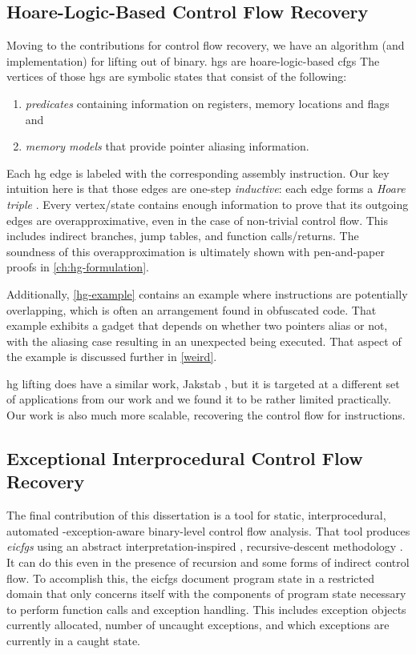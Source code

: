 \subsection{Hoare-Logic-Based Control Flow Recovery}
Moving to the contributions for control flow recovery, we have an algorithm (and implementation) for lifting  out of  binary.
\Acp{hg} are \gls{hoare-logic}-based \acp{cfg}
The vertices of those \acp{hg} are symbolic states that consist of the following:
\begin{enumerate}
  \item \emph{predicates} containing information on registers, memory locations and flags and
  \item \emph{memory models} that provide pointer aliasing information.
\end{enumerate}
Each \ac{hg} edge is labeled with the corresponding assembly instruction.
Our key intuition here is that those edges are one-step \emph{inductive}:
each edge forms a \emph{Hoare triple}
\autocite{hoare1969axiomatic}.
Every vertex/state contains enough information to prove that its outgoing edges are overapproximative,
even in the case of non-trivial control flow.
This includes indirect branches, jump tables, and function calls/returns.
The soundness of this overapproximation is ultimately shown with pen-and-paper proofs in \cref{ch:hg-formulation}.

Additionally, \cref{hg-example} contains an example where instructions are potentially overlapping, which is often an arrangement found in obfuscated code.
That example exhibits a  gadget that depends on whether two pointers alias or not, with the aliasing case resulting in an unexpected  being executed. That aspect of the example is discussed further in \cref{weird}.

\Ac{hg} lifting does have a similar work, Jakstab \autocite{kinder2010static,kinder2012alternating,kinder2012virtualization}, but it is targeted at a different set of applications from our work and we found it to be rather limited practically.
Our work is also much more scalable, recovering the control flow for  instructions.

\subsection{Exceptional Interprocedural Control Flow Recovery}
The final contribution of this dissertation is a tool for static, interprocedural, automated \Cpp-exception-aware%
 
binary-level control flow analysis.
That tool produces \emph{\acp{eicfg}} using an abstract interpretation-inspired , recursive-descent methodology .
It can do this even in the presence of recursion and some forms of indirect control flow.
To accomplish this, the \acp{eicfg} document program state in a restricted domain that only concerns itself with the components of program state necessary to perform function calls and exception handling.
This includes exception objects currently allocated, number of uncaught exceptions, and which exceptions are currently in a caught state.

